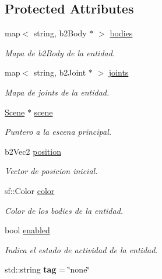 \subsection*{Protected Attributes}
\begin{DoxyCompactItemize}
\item 
map$<$ string, b2\+Body $\ast$ $>$ \mbox{\hyperlink{classexample_1_1_entity_aa5cc086c278afb464fc8df85df9e51de}{bodies}}
\begin{DoxyCompactList}\small\item\em Mapa de b2\+Body de la entidad. \end{DoxyCompactList}\item 
map$<$ string, b2\+Joint $\ast$ $>$ \mbox{\hyperlink{classexample_1_1_entity_a0024a9c16ac5758786cb3ce837fb2926}{joints}}
\begin{DoxyCompactList}\small\item\em Mapa de joints de la entidad. \end{DoxyCompactList}\item 
\mbox{\hyperlink{classexample_1_1_scene}{Scene}} $\ast$ \mbox{\hyperlink{classexample_1_1_entity_ab851dbde4a16829f9fb77ab9a66b9f1e}{scene}}
\begin{DoxyCompactList}\small\item\em Puntero a la escena principal. \end{DoxyCompactList}\item 
b2\+Vec2 \mbox{\hyperlink{classexample_1_1_entity_abfa8b41527466a41500b59393faec19a}{position}}
\begin{DoxyCompactList}\small\item\em Vector de posicion inicial. \end{DoxyCompactList}\item 
sf\+::\+Color \mbox{\hyperlink{classexample_1_1_entity_a400506e62c4c521965aaa26b536b32e7}{color}}
\begin{DoxyCompactList}\small\item\em Color de los bodies de la entidad. \end{DoxyCompactList}\item 
bool \mbox{\hyperlink{classexample_1_1_entity_aa406d8aad67b8e5778f78e2c34e8adb9}{enabled}}
\begin{DoxyCompactList}\small\item\em Indica el estado de actividad de la entidad. \end{DoxyCompactList}\item 
\mbox{\label{classexample_1_1_entity_a7f232e71ab36c200029dfe1289a96e51}} 
std\+::string {\bfseries tag} = \char`\"{}none\char`\"{}
\end{DoxyCompactItemize}


